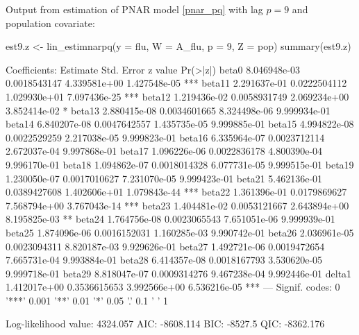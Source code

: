 Output from estimation of PNAR model \eqref{pnar_pq} with lag $p=9$ and population covariate:
\begin{example}
	est9.z <- lin_estimnarpq(y = flu, W = A_flu, p = 9, Z = pop)
	summary(est9.z)
	
	Coefficients: 
	           Estimate   Std. Error      z value     Pr(>|z|)    
	beta0  8.046948e-03 0.0018543147 4.339581e+00 1.427548e-05 ***
	beta11 2.291637e-01 0.0222504112 1.029930e+01 7.097436e-25 ***
	beta12 1.219436e-02 0.0058931749 2.069234e+00 3.852414e-02 *  
	beta13 2.880415e-08 0.0034601665 8.324498e-06 9.999934e-01    
	beta14 6.840207e-08 0.0047642557 1.435735e-05 9.999885e-01    
	beta15 4.994822e-08 0.0022529259 2.217038e-05 9.999823e-01    
	beta16 6.335964e-07 0.0023712114 2.672037e-04 9.997868e-01    
	beta17 1.096226e-06 0.0022836178 4.800390e-04 9.996170e-01    
	beta18 1.094862e-07 0.0018014328 6.077731e-05 9.999515e-01    
	beta19 1.230050e-07 0.0017010627 7.231070e-05 9.999423e-01    
	beta21 5.462136e-01 0.0389427608 1.402606e+01 1.079843e-44 ***
	beta22 1.361396e-01 0.0179869627 7.568794e+00 3.767043e-14 ***
	beta23 1.404481e-02 0.0053121667 2.643894e+00 8.195825e-03 ** 
	beta24 1.764756e-08 0.0023065543 7.651051e-06 9.999939e-01    
	beta25 1.874096e-06 0.0016152031 1.160285e-03 9.990742e-01    
	beta26 2.036961e-05 0.0023094311 8.820187e-03 9.929626e-01    
	beta27 1.492721e-06 0.0019472654 7.665731e-04 9.993884e-01    
	beta28 6.414357e-08 0.0018167793 3.530620e-05 9.999718e-01    
	beta29 8.818047e-07 0.0009314276 9.467238e-04 9.992446e-01    
	delta1 1.412017e+00 0.3536615653 3.992566e+00 6.536216e-05 ***
	--- 
	Signif. codes:  0 '***' 0.001 '**' 0.01 '*' 0.05 '.' 0.1 ' ' 1 
	
	Log-likelihood value:  4324.057 
	AIC: -8608.114 BIC: -8527.5 QIC: -8362.176
\end{example}


